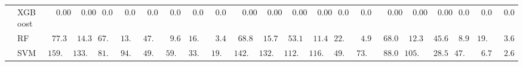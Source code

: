 \begin{tabular}{ll|ll|llllll|llllll|llllll}
	& XGBoost  & $\phantom{00}0.00$ & $\phantom{00}0.00$ & $\phantom{0}0.00$ & $\phantom{0}0.00$ & $\phantom{0}0.00$ & $\phantom{0}0.00$ & $\phantom{0}0.00$ & $\phantom{0}0.00$ & $\phantom{00}0.00$ & $\phantom{00}0.00$ & $\phantom{00}0.00$ & $\phantom{00}0.00$ & $\phantom{0}0.00$ & $\phantom{0}0.00$ & $\phantom{00}0.00$ & $\phantom{00}0.00$ & $\phantom{00}0.00$ & $\phantom{0}0.00$ & $\phantom{0}0.00$ & $\phantom{0}0.00$ \\
	& RF  & $\phantom{0}77.31$ & $\phantom{0}14.37$ & $67.78$ & $13.35$ & $47.85$ & $\phantom{0}9.60$ & $16.38$ & $\phantom{0}3.44$ & $\phantom{0}68.81$ & $\phantom{0}15.73$ & $\phantom{0}53.11$ & $\phantom{0}11.43$ & $22.23$ & $\phantom{0}4.96$ & $\phantom{0}68.02$ & $\phantom{0}12.31$ & $\phantom{0}45.69$ & $\phantom{0}8.92$ & $19.15$ & $\phantom{0}3.69$ \\
	& SVM  & $159.93$ & $133.99$ & $81.76$ & $94.03$ & $49.00$ & $59.08$ & $33.34$ & $19.99$ & $142.86$ & $132.04$ & $112.23$ & $116.37$ & $49.15$ & $73.90$ & $\phantom{0}88.08$ & $105.63$ & $\phantom{0}28.52$ & $47.94$ & $\phantom{0}6.74$ & $\phantom{0}2.65$ \\
	\hline 
\end{tabular}
